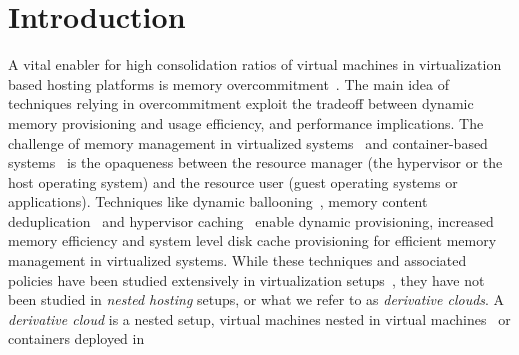 \section{Introduction}
\label{sec:intro}

A vital enabler for high consolidation ratios of virtual machines
in virtualization based hosting platforms
is memory overcommitment~\cite{vmware,vmware:memory}. 
%
The main idea of techniques relying in overcommitment 
exploit the tradeoff between
dynamic memory provisioning and usage efficiency, and 
performance implications.
%
%
%
%
The challenge of memory management in virtualized systems~\cite{xen,kvm,vmware}
and container-based systems~\cite{cgroup,docker,lxc} is 
the opaqueness between the resource manager (the hypervisor or
the host operating system) and the resource user (guest operating
systems or applications).
%
%
Techniques like dynamic ballooning~\cite{vmware,hotplug}, memory
content deduplication~\cite{vmware,ksmpaper} and hypervisor 
caching~\cite{memtrans,oracletmem,kvmzcache} 
enable dynamic provisioning, increased memory efficiency and 
system level disk cache provisioning for efficient memory 
management in virtualized systems.
%
While these techniques and associated policies have been studied
extensively in virtualization setups~\cite{vmware, membal, membud, kvmzcache, tws},
they have not been studied in \emph{nested hosting} setups, or
what we refer to as \emph{derivative clouds}.
%
A \emph{derivative cloud} is a nested setup, virtual machines
nested in virtual machines~\cite{blanket} or containers deployed in 

